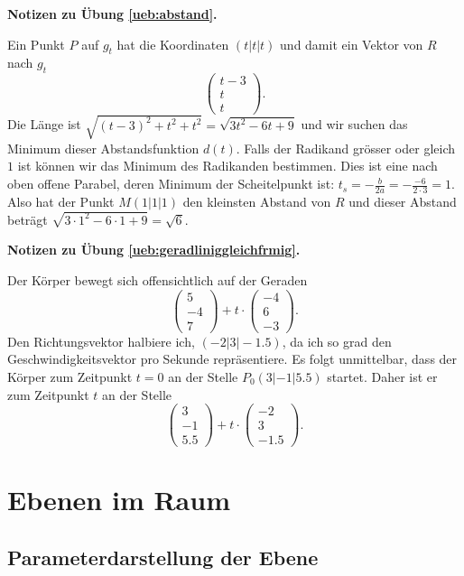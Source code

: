 \documentclass[%
11pt,%
twoside,%
titlepage,%
german,%
headsepline%
]{scrartcl}
\theoremstyle{definition}
\theoremstyle{plain}
\newcommand{\concatueb}[1]{ueb:#1}%
\newcommand{\concatlsg}[1]{lsg:#1}%
\newenvironment{lsg}[1]{%
    \par\noindent\textbf{Notizen zu Übung \ref{\concatueb{#1}}.}%
    \label{\concatlsg{#1}}
}{%
    \par%
}
\begin{document}
\begin{lsg}{abstand}
Ein Punkt $P$ auf $g_t$ hat die Koordinaten $(t|t|t)$ und damit ein Vektor von $R$ nach $g_t$
$$\begin{pmatrix}
    t-3\\t\\t
\end{pmatrix}.
$$
Die Länge ist $\sqrt{(t-3)^2+t^2+t^2}=\sqrt{3t^2-6t+9}$ und wir suchen das Minimum dieser Abstandsfunktion $d(t)$. Falls der Radikand grösser oder gleich $1$ ist können wir das Minimum des Radikanden bestimmen. Dies ist eine nach oben offene Parabel, deren Minimum der Scheitelpunkt ist: $t_s=-\frac{b}{2a}=-\frac{-6}{2\cdot 3}=1$. Also hat der Punkt $M(1|1|1)$ den kleinsten Abstand von $R$ und dieser Abstand beträgt $\sqrt{3\cdot1^2-6\cdot1+9}=\sqrt{6}$.
\end{lsg}
\begin{lsg}{geradliniggleichfrmig}
Der Körper bewegt sich offensichtlich auf der Geraden
$$\begin{pmatrix}
    5\\-4\\7
\end{pmatrix}+t\cdot\begin{pmatrix}
    -4\\6\\-3
\end{pmatrix}.$$
Den Richtungsvektor halbiere ich, $(-2|3|-1.5)$, da ich so grad den Geschwindigkeitsvektor pro Sekunde repräsentiere. Es folgt unmittelbar, dass der Körper zum Zeitpunkt $t=0$ an der Stelle $P_0(3|-1|5.5)$ startet. Daher ist er zum Zeitpunkt $t$ an der Stelle
$$\begin{pmatrix}
    3\\-1\\5.5
\end{pmatrix}+t\cdot\begin{pmatrix}
    -2\\3\\-1.5
\end{pmatrix}.$$
\end{lsg}

\clearpage

\section{Ebenen im Raum}

\subsection{Parameterdarstellung der Ebene}
\end{document}
